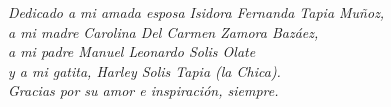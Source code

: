 \vspace*{5cm}
\begin{flushright}
    \emph{Dedicado a mi amada esposa Isidora Fernanda Tapia Muñoz, \\a mi madre Carolina Del Carmen Zamora Bazáez,\\ a mi padre Manuel Leonardo Solis Olate \\y a mi gatita, Harley Solis Tapia (la Chica). \\    Gracias por su amor e inspiración, siempre.}
\end{flushright}
    